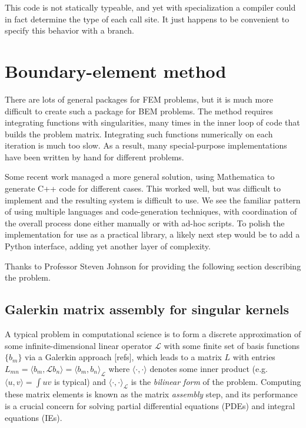 This code is not statically typeable, and yet with specialization a
compiler could in fact determine the type of each call site.
It just happens to be convenient to specify this behavior with a
branch.


\section{Boundary-element method}
\label{sec:BEM}

There are lots of general packages for FEM problems, but it is much more
difficult to create such a package for BEM problems. The method requires
integrating functions with singularities, many times in the inner loop
of code that builds the problem matrix. Integrating such functions
numerically on each iteration is much too slow. As a result, many
special-purpose implementations have been written by hand for different
problems.

Some recent work \cite{ReidWhJo14} managed a more general solution,
using Mathematica to generate C++ code for different cases. This worked
well, but was difficult to implement and the resulting system is difficult
to use. We see the familiar pattern of using multiple languages and
code-generation techniques, with coordination of the overall process done
either manually or with ad-hoc scripts. To polish the implementation for
use as a practical library, a likely next step would be to add a Python
interface, adding yet another layer of complexity.






Thanks to Professor Steven Johnson for providing the following section describing
the problem.

\subsection{Galerkin matrix assembly for singular kernels}

A typical problem in computational science is to form a discrete approximation of some infinite-dimensional linear operator $\mathcal{L}$ with some finite set of basis functions $\{ b_m \}$ via a Galerkin approach [refs], which leads to a matrix $L$ with entries $L_{mn} = \langle b_m, \mathcal{L} b_n \rangle = \langle b_m, b_n \rangle_\mathcal{L}$ where $\langle \cdot, \cdot \rangle$ denotes some inner product (e.g. $\langle u, v \rangle = \int u v$ is typical) and  $\langle \cdot, \cdot \rangle_\mathcal{L}$ is the \emph{bilinear form} of the problem.  Computing these matrix elements is known as the matrix \emph{assembly} step, and its performance is a crucial concern for solving partial differential equations (PDEs) and integral equations (IEs).


